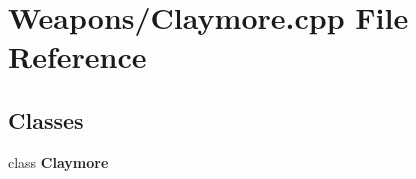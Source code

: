 \section{Weapons/\-Claymore.cpp File Reference}
\label{_claymore_8cpp}
\subsection*{Classes}
\begin{DoxyCompactItemize}
\item 
class {\bf Claymore}
\end{DoxyCompactItemize}

